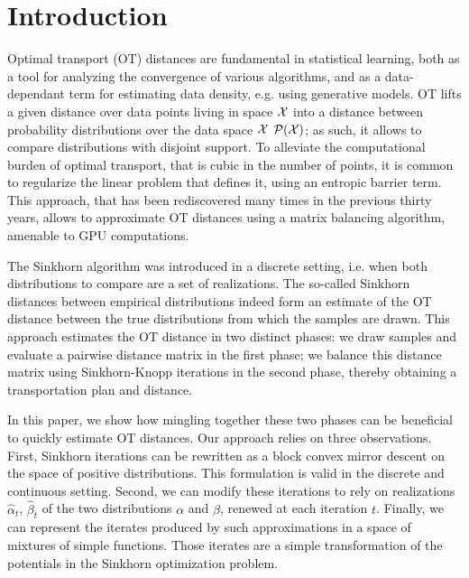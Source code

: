 \section{Introduction}

Optimal transport (OT) distances are fundamental in statistical learning, both
as a tool for analyzing the convergence of various algorithms, and as a
data-dependant term for estimating data density, e.g. using generative models.
OT lifts a given distance over data points living in space $\mathcal{X}$ into a distance
between probability distributions over the data space $\mathcal{X}$ $\mathcal{P}(\mathcal{X})$; as such,
it allows to compare distributions with disjoint support. To alleviate the
computational burden of optimal transport, that is cubic in the number of
points, it is common to regularize the linear problem that defines it, using an
entropic barrier term. This approach, that has been rediscovered many times in
the previous thirty years, allows to approximate OT distances using a matrix
balancing algorithm, amenable to GPU computations.

The Sinkhorn algorithm was introduced in a discrete setting, i.e. when both
distributions to compare are a set of realizations. The so-called Sinkhorn
distances between empirical distributions indeed form an estimate of the OT
distance between the true distributions from which the samples are drawn. This
approach estimates the OT distance in two distinct phases: we draw samples and
evaluate a pairwise distance matrix in the first phase; we balance this distance
matrix using Sinkhorn-Knopp iterations in the second phase, thereby obtaining a
transportation plan and distance.




In this paper, we show how mingling together these two phases can be beneficial
to quickly estimate OT distances.  Our approach relies on three observations. First,
Sinkhorn iterations can be rewritten as a block convex mirror descent on the
space of positive distributions. This formulation is valid in the discrete and
continuous setting. Second, we can modify these iterations to rely on
realizations $\hat \alpha_t$, $\hat \beta_t$ of the two distributions $\alpha$
and $\beta$, renewed at each iteration $t$. Finally, we can represent the
iterates produced by such approximations in a space of mixtures of simple
functions. Those iterates are a simple transformation of the potentials in the
Sinkhorn optimization problem.

